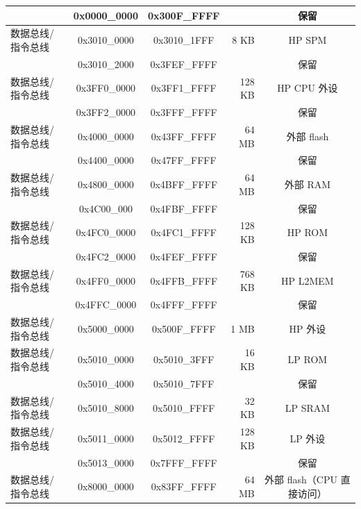 \begin{ThreePartTable}
\begin{longtable}[c]{|p{3.5cm}|c|c|r|c| }
        \rowcolor{gray!25}  & 0x0000\_0000 & 0x300F\_FFFF &        & 保留      \\\hline
        {数据总线/指令总线} & 0x3010\_0000 & 0x3010\_1FFF & 8 KB  & HP SPM  \\\hline
        \hline
        \rowcolor{gray!25}  & 0x3010\_2000 & 0x3FEF\_FFFF &         & 保留      \\\hline
        {数据总线/指令总线} & 0x3FF0\_0000 & 0x3FF1\_FFFF & 128 KB  & HP CPU 外设 \\\hline
        \hline
        \rowcolor{gray!25}  & 0x3FF2\_0000 & 0x3FFF\_FFFF &         & 保留      \\\hline
        {数据总线/指令总线} & 0x4000\_0000 & 0x43FF\_FFFF & 64 MB & 外部 flash \\\hline
        \rowcolor{gray!25}  & 0x4400\_0000 & 0x47FF\_FFFF &         & 保留      \\\hline
        {数据总线/指令总线} & 0x4800\_0000 & 0x4BFF\_FFFF & 64 MB  & 外部 RAM
        \\\hline
        \rowcolor{gray!25}  & 0x4C00\_000 & 0x4FBF\_FFFF &         & 保留      \\\hline
        {数据总线/指令总线} & 0x4FC0\_0000 & 0x4FC1\_FFFF & 128 KB  & HP ROM
        \\\hline
        \rowcolor{gray!25}  & 0x4FC2\_0000 & 0x4FEF\_FFFF &         & 保留      \\\hline
        {数据总线/指令总线} & 0x4FF0\_0000 & 0x4FFB\_FFFF & 768 KB  & HP L2MEM \\\hline
        \rowcolor{gray!25}  & 0x4FFC\_0000 & 0x4FFF\_FFFF &         & 保留      \\\hline
        {数据总线/指令总线} & 0x5000\_0000 & 0x500F\_FFFF & 1 MB  & HP 外设 \\\hline
        {数据总线/指令总线} & 0x5010\_0000 & 0x5010\_3FFF & 16 KB  & LP ROM \\\hline
        \rowcolor{gray!25}  & 0x5010\_4000 & 0x5010\_7FFF &         & 保留      \\\hline
        {数据总线/指令总线} & 0x5010\_8000 & 0x5010\_FFFF & 32 KB  & LP SRAM \\\hline
        {数据总线/指令总线} & 0x5011\_0000 & 0x5012\_FFFF & 128 KB  & LP 外设 \\\hline
        \rowcolor{gray!25}  & 0x5013\_0000 & 0x7FFF\_FFFF &         & 保留      \\\hline
        {数据总线/指令总线} & 0x8000\_0000 & 0x83FF\_FFFF & 64 MB  & 外部 flash（CPU 直接访问） \\\hline

\end{longtable}
\end{ThreePartTable}
